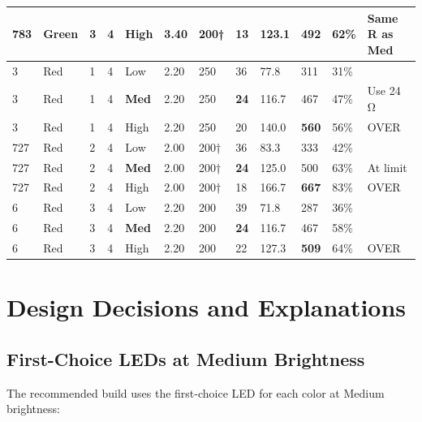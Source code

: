 \documentclass[12pt,letterpaper]{article}
\begin{document}
\begin{longtable}{C{0.6cm} L{1.0cm} C{0.5cm} C{0.5cm} C{1.0cm} C{0.8cm} C{0.9cm}
                  C{1.1cm} C{1.1cm} C{0.9cm} C{0.9cm} C{0.9cm}}
783  & Green  & 3 & 4 & High & 3.40 & 200† & 13  & 123.1 & 492 & 62\% & Same R as Med \\
\midrule
3    & Red    & 1 & 4 & Low  & 2.20 & 250 & 36  & 77.8 & 311 & 31\% & \\
3    & Red    & 1 & 4 & \textbf{Med}  & 2.20 & 250 & \textbf{24} & 116.7 & 467 & 47\% & Use 24\,\si{\ohm} \\
3    & Red    & 1 & 4 & High & 2.20 & 250 & 20  & 140.0 & \textcolor{warnred}{\textbf{560}} & 56\% & \textcolor{warnred}{OVER} \\
727  & Red    & 2 & 4 & Low  & 2.00 & 200† & 36 & 83.3 & 333 & 42\% & \\
727  & Red    & 2 & 4 & \textbf{Med}  & 2.00 & 200† & \textbf{24} & 125.0 & 500 & 63\% & At limit \\
727  & Red    & 2 & 4 & High & 2.00 & 200† & 18  & 166.7 & \textcolor{warnred}{\textbf{667}} & 83\% & \textcolor{warnred}{OVER} \\
6    & Red    & 3 & 4 & Low  & 2.20 & 200 & 39  & 71.8 & 287 & 36\% & \\
6    & Red    & 3 & 4 & \textbf{Med}  & 2.20 & 200 & \textbf{24} & 116.7 & 467 & 58\% & \\
6    & Red    & 3 & 4 & High & 2.20 & 200 & 22  & 127.3 & \textcolor{warnred}{\textbf{509}} & 64\% & \textcolor{warnred}{OVER} \\

\end{longtable}

\section{Design Decisions and Explanations}

\subsection{First-Choice LEDs at Medium Brightness}

The recommended build uses the first-choice LED for each color at Medium brightness:
\end{document}
